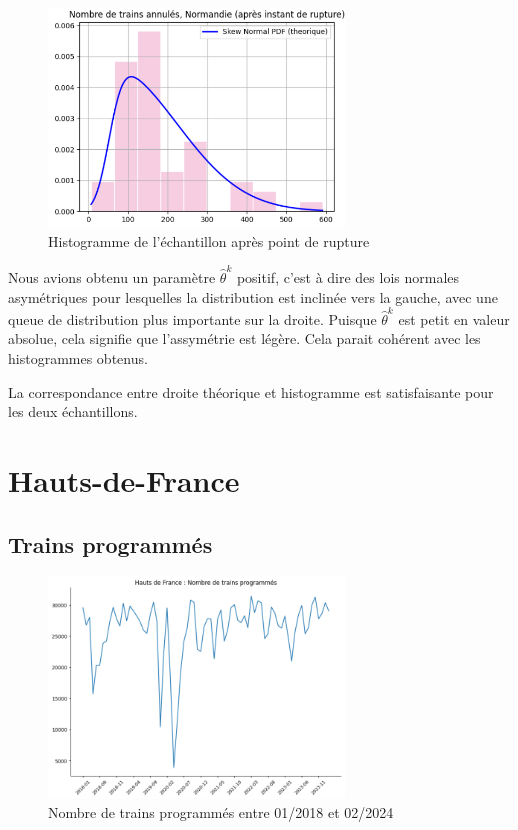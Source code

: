 {\begin{figure}[H]
  \centering
  \includegraphics[width=0.7\textwidth]{Nor_TA_5.png}
  \caption{Histogramme de l'échantillon après point de rupture}
\end{figure}

Nous avions obtenu un paramètre $\hat{\theta}^k$ positif, c'est à dire des lois normales asymétriques pour lesquelles la distribution est inclinée vers la gauche, avec une queue de distribution plus importante sur la droite. Puisque $\hat{\theta}^k$ est petit en valeur absolue, cela signifie que l'assymétrie est légère. Cela parait cohérent avec les histogrammes obtenus.

La correspondance entre droite théorique et histogramme est satisfaisante pour les deux échantillons.

\section{Hauts-de-France}

\subsection{Trains programmés}

\begin{figure}[H]
  \centering
  \includegraphics[width=0.7\textwidth]{HF_TP_1.png}
  \caption{Nombre de trains programmés entre 01/2018 et 02/2024}
\end{figure}

}
